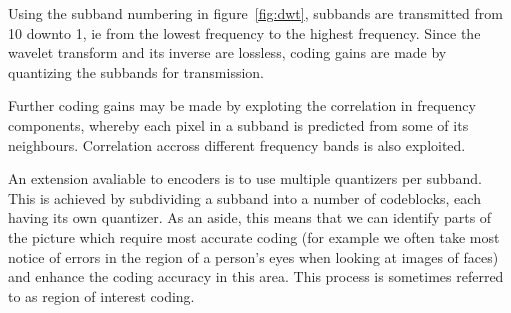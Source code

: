 Using the subband numbering in figure~\ref{fig:dwt}, subbands are
transmitted from 10 downto 1, ie from the lowest frequency to the
highest frequency.  Since the wavelet transform and its inverse are
lossless, coding gains are made by quantizing the subbands for
transmission.

Further coding gains may be made by exploting the correlation in
frequency components, whereby each pixel in a subband is predicted from
some of its neighbours.  Correlation accross different frequency bands
is also exploited.

An extension avaliable to encoders is to use multiple quantizers per
subband.  This is achieved by subdividing a subband into a number of
codeblocks, each having its own quantizer.  As an aside, this means that
we can identify parts of the picture which require most accurate coding
(for example we often take most notice of errors in the region of a
person's eyes when looking at images of faces) and enhance the coding
accuracy in this area. This process is sometimes referred to as region
of interest coding.
